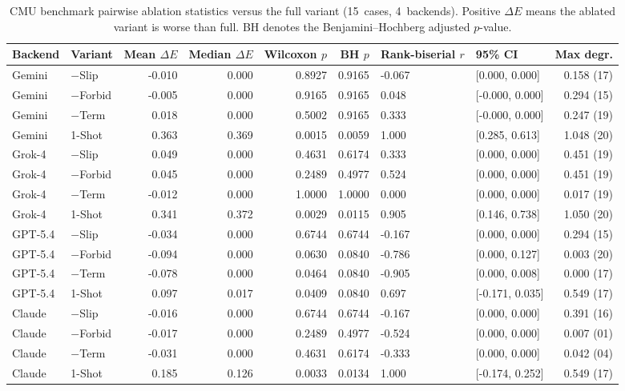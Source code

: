 \begin{table}[h]
\centering
\small
\caption{CMU benchmark pairwise ablation statistics versus the full variant (15~cases, 4~backends). Positive $\Delta E$ means the ablated variant is worse than full. BH denotes the Benjamini--Hochberg adjusted $p$-value.}
\label{tab:si4-ablation-statistics}
\begin{tabular}{llrrrrllr}
\toprule
Backend & Variant & Mean $\Delta E$ & Median $\Delta E$ & Wilcoxon $p$ & BH $p$ & Rank-biserial $r$ & 95\% CI & Max degr. \\
\midrule
Gemini & $-$Slip & -0.010 & 0.000 & 0.8927 & 0.9165 & -0.067 & [0.000, 0.000] & 0.158 (17) \\
Gemini & $-$Forbid & -0.005 & 0.000 & 0.9165 & 0.9165 & 0.048 & [-0.000, 0.000] & 0.294 (15) \\
Gemini & $-$Term & 0.018 & 0.000 & 0.5002 & 0.9165 & 0.333 & [-0.000, 0.000] & 0.247 (19) \\
Gemini & 1-Shot & 0.363 & 0.369 & 0.0015 & 0.0059 & 1.000 & [0.285, 0.613] & 1.048 (20) \\
Grok-4 & $-$Slip & 0.049 & 0.000 & 0.4631 & 0.6174 & 0.333 & [0.000, 0.000] & 0.451 (19) \\
Grok-4 & $-$Forbid & 0.045 & 0.000 & 0.2489 & 0.4977 & 0.524 & [0.000, 0.000] & 0.451 (19) \\
Grok-4 & $-$Term & -0.012 & 0.000 & 1.0000 & 1.0000 & 0.000 & [0.000, 0.000] & 0.017 (19) \\
Grok-4 & 1-Shot & 0.341 & 0.372 & 0.0029 & 0.0115 & 0.905 & [0.146, 0.738] & 1.050 (20) \\
GPT-5.4 & $-$Slip & -0.034 & 0.000 & 0.6744 & 0.6744 & -0.167 & [0.000, 0.000] & 0.294 (15) \\
GPT-5.4 & $-$Forbid & -0.094 & 0.000 & 0.0630 & 0.0840 & -0.786 & [0.000, 0.127] & 0.003 (20) \\
GPT-5.4 & $-$Term & -0.078 & 0.000 & 0.0464 & 0.0840 & -0.905 & [0.000, 0.008] & 0.000 (17) \\
GPT-5.4 & 1-Shot & 0.097 & 0.017 & 0.0409 & 0.0840 & 0.697 & [-0.171, 0.035] & 0.549 (17) \\
Claude & $-$Slip & -0.016 & 0.000 & 0.6744 & 0.6744 & -0.167 & [0.000, 0.000] & 0.391 (16) \\
Claude & $-$Forbid & -0.017 & 0.000 & 0.2489 & 0.4977 & -0.524 & [0.000, 0.000] & 0.007 (01) \\
Claude & $-$Term & -0.031 & 0.000 & 0.4631 & 0.6174 & -0.333 & [0.000, 0.000] & 0.042 (04) \\
Claude & 1-Shot & 0.185 & 0.126 & 0.0033 & 0.0134 & 1.000 & [-0.174, 0.252] & 0.549 (17) \\
\bottomrule
\end{tabular}
\end{table}

